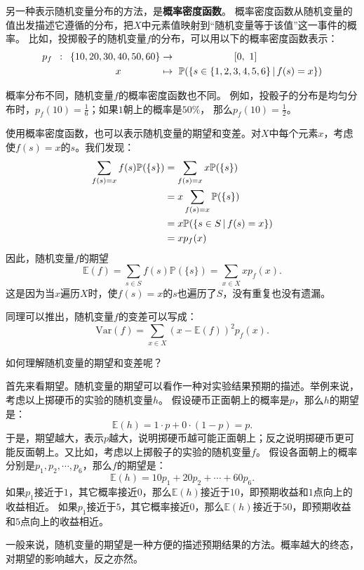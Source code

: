 \documentclass[12pt,UTF8]{ctexbook}
\begin{document}
另一种表示随机变量分布的方法，是\textbf{概率密度函数}。
概率密度函数从随机变量的值出发描述它遵循的分布，把$X$中元素值映射到“随机变量等于该值”这一事件的概率。
比如，投掷骰子的随机变量$f$的分布，可以用以下的概率密度函数表示：
\begin{align}
p_f \,\,\, : \,\,\,  \{10,20,30,40,50,60\} &\rightarrow \qquad\qquad\qquad [0, \,\, 1] \notag \\
  x\qquad\qquad &\mapsto \,\, \mathbb{P}(\{s \in \{1,2,3,4,5,6\} \,|\, f(s) = x\}) \notag 
\end{align}

概率分布不同，随机变量$f$的概率密度函数也不同。
例如，投骰子的分布是均匀分布时，$p_f(10) = \frac{1}{6}$；如果$1$朝上的概率是$50\%$，
那么$p_f(10) = \frac{1}{2}$。

使用概率密度函数，也可以表示随机变量的期望和变差。对$X$中每个元素$x$，考虑使$f(s) = x$的$s$。我们发现：
\begin{align}
    \sum_{f(s) = x} f(s) \mathbb{P}(\{s\}) &= \sum_{f(s) = x} x \mathbb{P}(\{s\}) \notag \\
    &= x \sum_{f(s) = x} \mathbb{P}(\{s\}) \notag \\
    &= x \mathbb{P}(\{s \in S \,|\, f(s) = x\}) \notag \\
    &= x p_f(x) \notag  
\end{align}
因此，随机变量$f$的期望
$$ \mathbb{E}(f) = \sum_{s\in S} f(s) \mathbb{P}(\{s\}) = \sum_{x \in X} x p_f(x). $$
这是因为当$x$遍历$X$时，使$f(s) = x$的$s$也遍历了$S$，没有重复也没有遗漏。

同理可以推出，随机变量$f$的变差可以写成：
$$ \mathrm{Var}(f)  = \sum_{x\in X} \left(x - \mathbb{E}(f)\right)^2 p_f(x).$$ 

如何理解随机变量的期望和变差呢？

首先来看期望。随机变量的期望可以看作一种对实验结果预期的描述。举例来说，考虑以上掷硬币的实验的随机变量$h$。
假设硬币正面朝上的概率是$p$，那么$h$的期望是：
$$ \mathbb{E}(h) = 1\cdot p + 0\cdot (1 - p) = p. $$
于是，期望越大，表示$p$越大，说明掷硬币越可能正面朝上；反之说明掷硬币更可能反面朝上。又比如，考虑以上掷骰子的实验的随机变量$f$。
假设各面朝上的概率分别是$p_1, p_2, \cdots , p_6$，那么$f$的期望是：
$$ \mathbb{E}(h) = 10p_1 + 20p_2 + \cdots + 60p_6. $$
如果$p_1$接近于$1$，其它概率接近$0$，那么$\mathbb{E}(h)$接近于$10$，即预期收益和$1$点向上的收益相近。
如果$p_1$接近于$5$，其它概率接近$0$，那么$\mathbb{E}(h)$接近于$50$，即预期收益和$5$点向上的收益相近。

一般来说，随机变量的期望是一种方便的描述预期结果的方法。概率越大的终态，对期望的影响越大，反之亦然。
\end{document}
